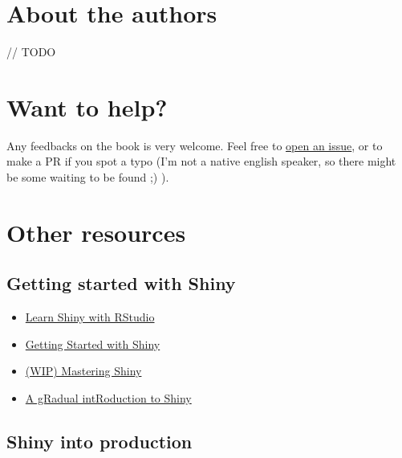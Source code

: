\documentclass[]{book}
\providecommand{\tightlist}{%
  \setlength{\itemsep}{0pt}\setlength{\parskip}{0pt}}
\begin{document}
\hypertarget{about-the-authors}{%
\section*{About the authors}\label{about-the-authors}}

// TODO

\hypertarget{want-to-help}{%
\section*{Want to help?}\label{want-to-help}}

Any feedbacks on the book is very welcome. Feel free to \href{https://github.com/ThinkR-open/building-shiny-apps-workflow/issues}{open an issue}, or to make a PR if you spot a typo (I'm not a native english speaker, so there might be some waiting to be found ;) ).

\hypertarget{other-resources}{%
\section*{Other resources}\label{other-resources}}

\hypertarget{getting-started-with-shiny}{%
\subsection{Getting started with Shiny}\label{getting-started-with-shiny}}

\begin{itemize}
\tightlist
\item
  \href{https://shiny.rstudio.com/tutorial/}{Learn Shiny with RStudio}
\item
  \href{https://ourcodingclub.github.io/2017/03/07/shiny.html}{Getting Started with Shiny}
\item
  \href{https://github.com/jcheng5/shiny-book}{(WIP) Mastering Shiny}
\item
  \href{https://laderast.github.io/gradual_shiny/}{A gRadual intRoduction to Shiny}
\end{itemize}

\hypertarget{shiny-into-production}{%
\subsection{Shiny into production}\label{shiny-into-production}}
\end{document}
